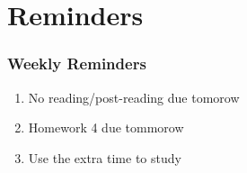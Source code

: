 \documentclass{beamer}
\begin{document}
\section{Reminders}
%
%
\begin{frame}
  \frametitle{Weekly Reminders}
  \begin{enumerate}[A]
    \item No reading/post-reading due tomorow
    \item Homework 4 due tommorow
    \item Use the extra time to study
  \end{enumerate}
\end{frame}
\end{document}
